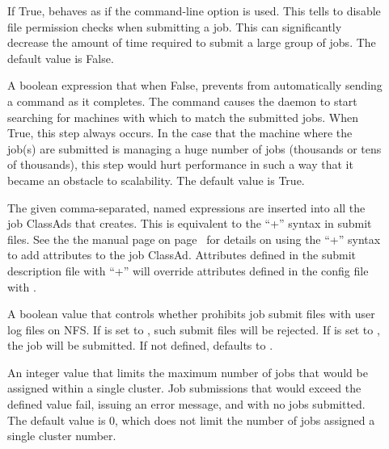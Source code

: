 \begin{description}
\item[] \label{param:SubmitSkipFilecheck}
  If True,  behaves as if the  
  command-line option is used.
  This tells  to disable file permission checks when
  submitting a job.
  This can significantly decrease the amount of time required to submit
  a large group of jobs.
  The default value is False.

\item[] \label{param:SubmitSendReschedule}
  A boolean expression that when False, prevents  from
  automatically sending a  command as it completes.
  The  command causes the  daemon
  to start searching for machines with which to match the submitted
  jobs.  When True, this step always occurs.
  In the case that the machine where the job(s) are submitted is
  managing a huge number of jobs (thousands or tens of thousands),
  this step would hurt performance in such a way that it became
  an obstacle to scalability.
  The default value is True.

\item[] \label{param:SubmitExprs}
  The given comma-separated, named expressions are inserted into all 
  the job ClassAds that  creates.  This is equivalent
  to the ``+'' syntax in submit files.  See the
  the  manual page
  on page~\pageref{man-condor-submit} for details on using the ``+''
  syntax to add attributes to the job ClassAd.
  Attributes defined in the submit description file with ``+'' will
  override attributes defined in the config file with
  . 

\item[] \label{param:LogOnNfsIsError}
  A boolean value that controls whether  prohibits
  job submit files with user log files on NFS.  If
   is set to , such
  submit files will be rejected.  If 
  is set to ,
  the job will be submitted.  If not defined,
   defaults to .

\item[]
  \label{param:SubmitMaxProcsInCluster}
  An integer value that limits the maximum number of jobs that would
  be assigned within a single cluster.  Job submissions that would exceed
  the defined value fail, issuing an error message, and with no jobs
  submitted.
  The default value is 0, which does not limit the number of jobs
  assigned a single cluster number.

\end{description}

